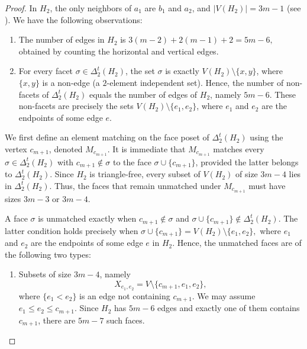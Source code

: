 \documentclass[11pt,reqno,a4paper]{amsart}
\theoremstyle{definition}
\theoremstyle{theorem}
\newcommand{\lno}{\left(}
\newcommand{\rno}{\right)}
\theoremstyle{remark}
\begin{document}
\begin{proof}
    In $H_2$, the only neighbors of $a_{1}$ are $b_{1}$ and $a_{2}$, and 
    $\lvert V \lno H_2 \rno \rvert = 3m-1$ 
    (see ). 
    We have the following observations:

    \begin{enumerate}[label=\arabic*.]
        \item The number of edges in $H_2$ is 
        \(
            3(m-2) + 2(m-1) + 2 = 5m - 6,
        \)
        obtained by counting the horizontal and vertical edges.

        \item For every facet $\sigma \in \Delta_2^t \lno H_2 \rno$,  
        the set $\sigma$ is exactly 
        \( V\lno H_2 \rno \setminus \{x, y\} \), 
        where $\{x, y\}$ is a non-edge (a $2$-element independent set). 
        Hence, the number of non-facets of 
        $\Delta_2^t \lno H_2 \rno$ equals the number of edges of $H_2$, 
        namely $5m - 6$. 
        These non-facets are precisely the sets 
        \( V\lno H_2 \rno \setminus \{e_1, e_2\} \), 
        where $e_1$ and $e_2$ are the endpoints of some edge $e$.
    \end{enumerate}
    
    We first define an element matching on the face poset of $\Delta_2^t \lno H_2 \rno$ using the vertex $c_{m+1}$, denoted $M_{c_{m+1}}$. 
    It is immediate that $M_{c_{m+1}}$ matches every $\sigma \in \Delta_2^t \lno H_2 \rno$ with $c_{m+1} \notin \sigma$ to the face 
    $\sigma \cup \{c_{m+1}\}$, provided the latter belongs to $\Delta_2^t \lno H_2 \rno$. 
    Since $H_2$ is triangle-free, every subset of $V\lno H_2 \rno$ of size $3m-4$ lies in $\Delta_2^t \lno H_2 \rno$. 
    Thus, the faces that remain unmatched under $M_{c_{m+1}}$ must have sizes $3m-3$ or $3m-4$.
    
    A face $\sigma$ is unmatched exactly when  
    $c_{m+1} \notin \sigma$ and 
    $\sigma \cup \{c_{m+1}\} \notin \Delta_2^t \lno H_2 \rno$. 
    The latter condition holds precisely when  
    \(
    \sigma \cup \{c_{m+1}\} 
        = V\lno H_2 \rno \setminus \{e_1, e_2\},
    \)
    where $e_1$ and $e_2$ are the endpoints of some edge $e$ in $H_2$. 
    Hence, the unmatched faces are of the following two types:

    \begin{enumerate}[label=\textbf{Type }\Roman*:, leftmargin=4em]
    \item Subsets of size $3m-4$, namely
    \[
        X_{e_1,e_2} 
            = V \setminus \{c_{m+1}, e_1, e_2\},
    \]
    where $\{e_1 < e_2\}$ is an edge not containing $c_{m+1}$. 
    We may assume $e_1 \le e_2 \le c_{m+1}$. 
    Since $H_2$ has $5m-6$ edges and exactly one of them contains $c_{m+1}$, 
    there are $5m - 7$ such faces.


\end{enumerate}
\end{proof}
\end{document}

